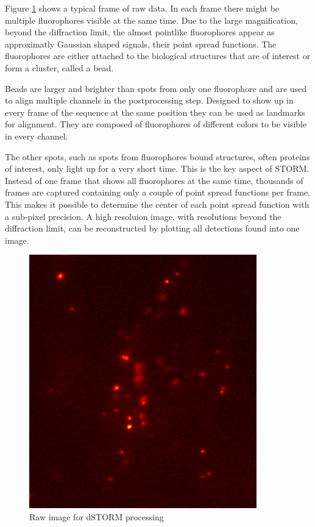 Figure \ref{rawStorm} shows a typical frame of raw data. In each frame there might be multiple fluorophores visible at the same time. Due to the large magnification, beyond the diffraction limit, the almost pointlike fluorophores appear as approximatly Gaussian shaped signals, their point spread functions. The fluorophores are either attached to the biological structures that are of interest or form a cluster, called a bead.\newline

Beads are larger and brighter than spots from only one fluorophore and are used to align multiple channels in the postprocessing step. Designed to show up in every frame of the sequence at the same position they can be used as landmarks for alignment. They are composed of fluorophores of different colors to be visible in every channel.\newline

The other spots, such as spots from fluorophores bound structures, often proteins of interest, only light up for a very short time. This is the key aspect of STORM. Instead of one frame that shows all fluorophores at the same time, thousands of frames are captured containing only a couple of point spread functions per frame. This makes it possible to determine the center of each point spread function with a sub-pixel precision. A high resoluion image, with resolutions beyond the diffraction limit, can be reconstructed by plotting all detections found into one image.

\begin{figure}
\centering
\includegraphics[width = 0.88\textwidth]{pictures/Pos2_2_red2-2frame2475Color.png}
	\caption{Raw image for dSTORM processing}
	\label{rawStorm}
\end{figure}


